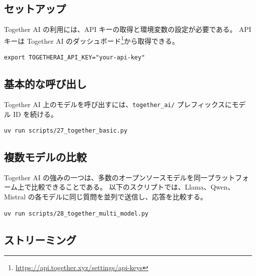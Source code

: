 \documentclass[a4paper,11pt]{ltjsarticle}
\newcommand{\code}[1]{\texttt{#1}}
\begin{document}
\subsection{セットアップ}

Together AI の利用には、API キーの取得と環境変数の設定が必要である。
API キーは Together AI のダッシュボード\footnote{\url{https://api.together.xyz/settings/api-keys}}から取得できる。

\begin{lstlisting}[style=bash]
export TOGETHERAI_API_KEY="your-api-key"
\end{lstlisting}

\subsection{基本的な呼び出し}
\label{subsec:together_basic}

Together AI 上のモデルを呼び出すには、\code{together\_ai/} プレフィックスにモデル ID を続ける。



\begin{lstlisting}[style=bash]
uv run scripts/27_together_basic.py
\end{lstlisting}

\subsection{複数モデルの比較}
\label{subsec:together_multi}

Together AI の強みの一つは、多数のオープンソースモデルを同一プラットフォーム上で比較できることである。
以下のスクリプトでは、Llama、Qwen、Mistral の各モデルに同じ質問を並列で送信し、応答を比較する。



\begin{lstlisting}[style=bash]
uv run scripts/28_together_multi_model.py
\end{lstlisting}

\subsection{ストリーミング}
\label{subsec:together_streaming}
\end{document}
